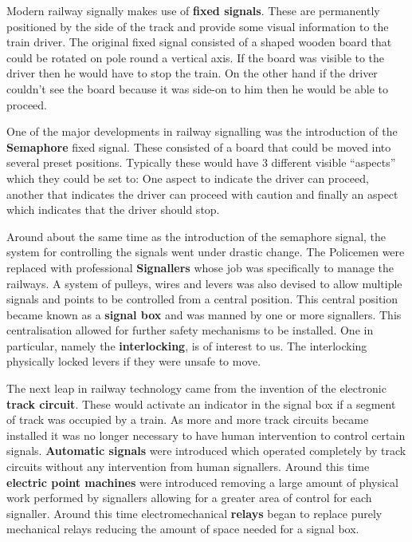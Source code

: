 Modern railway signally makes use of \textbf{fixed signals}. These are permanently positioned
by the side of the track and provide some visual information to the train driver.
The original fixed signal consisted of a shaped wooden board that could be
rotated on pole round a vertical axis. If the board was visible to the driver
then he would have to stop the train. On the other hand if the driver couldn't
see the board because it was side-on to him then he would be able to
proceed.

One of the major developments in railway signalling was the introduction of
the \textbf{Semaphore} fixed signal. These consisted of a board that could be
moved into several preset positions. Typically these would have  3 different visible
``aspects'' which they could be set to: One aspect to indicate the driver can
proceed, another that indicates the driver can proceed with caution and
finally an aspect which indicates that the driver should stop. 

Around about the same time as the introduction of the semaphore signal, the system
for controlling the signals went under drastic change. The Policemen were
replaced with professional \textbf{Signallers} whose job was specifically to
manage the railways. A system of pulleys, wires and levers was also devised
to allow multiple signals and points to be controlled from a central
position. This central position became known as a \textbf{signal box} and was
manned by one or more signallers. This centralisation allowed for further
safety mechanisms to be installed. One in particular, namely the \textbf{interlocking},
is of interest to us. The interlocking physically locked levers if they were
unsafe to move.

The next leap in railway technology came from the invention of the electronic
\textbf{track circuit}. These would activate an indicator in the signal box if a
segment of track was occupied by a train. As more and more track circuits
became installed it was no longer necessary to have human intervention to
control certain signals. \textbf{Automatic signals} were introduced which
operated completely by track circuits without any intervention from human
signallers. Around this time \textbf{electric point machines} were introduced
removing a large amount of physical work performed by signallers allowing for
a greater area of control for each signaller.  Around this time
electromechanical \textbf{relays} began to replace purely mechanical relays
reducing the amount of space needed for a signal box.

